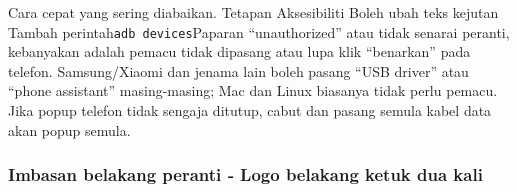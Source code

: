 \begin{tcbwarn}{Cara cepat yang sering diabaikan.}
Tetapan Aksesibiliti Boleh ubah teks kejutan Tambah perintah\texttt{adb devices}Paparan “unauthorized” atau tidak senarai peranti, kebanyakan adalah pemacu tidak dipasang atau lupa klik “benarkan” pada telefon. Samsung/Xiaomi dan jenama lain boleh pasang “USB driver” atau “phone assistant” masing-masing; Mac dan Linux biasanya tidak perlu pemacu. Jika popup telefon tidak sengaja ditutup, cabut dan pasang semula kabel data akan popup semula.

\end{tcbwarn}

\subsubsection*{Imbasan belakang peranti ‑ Logo belakang ketuk dua kali}

